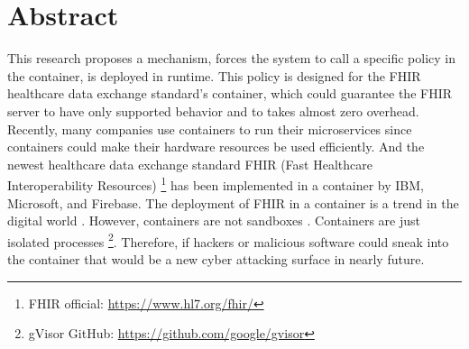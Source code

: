\chapter*{Abstract}

This research proposes
a mechanism, forces the system to call a specific policy in the container, is deployed in
runtime. This policy is designed for the FHIR healthcare data exchange standard's container, which
could guarantee the FHIR server to have only supported behavior and to takes almost zero overhead.
Recently, many companies use containers to run their microservices since containers could
make their hardware resources be used efficiently. And the newest healthcare data exchange
standard FHIR (Fast Healthcare Interoperability Resources) 
\footnote{{FHIR official:  \href{https://www.hl7.org/fhir/}{https://www.hl7.org/fhir/}}} has been implemented
in a container by IBM, Microsoft, and Firebase. The deployment of FHIR in a container is a trend
in the digital world \cite{8473370}. However, containers are not sandboxes \cite{10.5555/1267569.1267570}
. Containers are just isolated processes \footnote{gVisor GitHub: \url{https://github.com/google/gvisor}}.
Therefore, if hackers or malicious software could sneak
into the container that would be a new cyber attacking surface in nearly future.